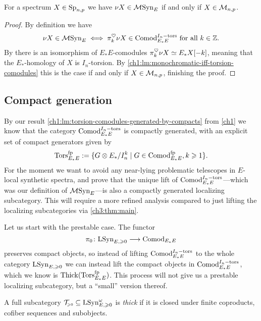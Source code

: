 \begin{lemma}
    \label{ch3:add:lm:mono-iff-syn-mono}
    For a spectrum $X\in \mathrm{Sp}_{n,p}$ we have $\nu X \in \mathcal{M}\mathrm{Syn}_{E}$ if and only if $X\in \mathcal{M}_{n,p}$. 
\end{lemma}
\begin{proof}
    By definition we have 
    \[\nu X \in \mathcal{M}\mathrm{Syn}_{E} \iff \pi_k^\heartsuit \nu X \in \mathrm{Comod}_{E_*E}^{I_n-\mathrm{tors}} \text{ for all } k\in \mathbb{Z}.\]
    By \cite[4.21, 4.22]{pstragowski_2022} there is an isomorphism of $E_*E$-comodules $\pi_k^\heartsuit \nu X \simeq E_{*} X[-k]$, meaning that the $E_{*}$-homology of $X$ is $I_n$-torsion. By \cref{ch1:lm:monochromatic-iff-torsion-comodules} this is the case if and only if $X\in \mathcal{M}_{n,p}$, finishing the proof. 
\end{proof}










\subsection{Compact generation}

By our result \cref{ch1:lm:torsion-comodules-generated-by-compacts} from \cref{ch1} we know that the category $\mathrm{Comod}_{E_*E}^{I_n-\mathrm{tors}}$ is compactly generated, with an explicit set of compact generators given by 
\[\mathrm{Tors}_{E_*E}^{\mathrm{fp}} := \{G\otimes E_*/I_n^k \mid G\in \mathrm{Comod}_{E_*E}^{\mathrm{fp}}, k\geqslant 1\}.\]
For the moment we want to avoid any near-lying problematic telescopes in $E$-local synthetic spectra, and prove that the unique lift of $\mathrm{Comod}_{E_*E}^{I_n-\mathrm{tors}}$---which was our definition of $\mathcal{M}\mathrm{Syn}_{E}$---is also a compactly generated localizing subcategory. This will require a more refined analysis compared to just lifting the localizing subcategories via \cref{ch3:thm:main}. 

Let us start with the prestable case. The functor 
\[\pi_0 \colon \mathrm{LSyn}_{E, \geqslant 0} \longrightarrow \mathrm{Comod}_{E_*E}\]
preserves compact objects, so instead of lifting $\mathrm{Comod}_{E_*E}^{I_n-\mathrm{tors}}$ to the whole category $\mathrm{LSyn}_{E, \geqslant 0}$ we can instead lift the compact objects in $\mathrm{Comod}_{E_*E}^{I_n-\mathrm{tors}}$, which we know is $\operatorname{Thick}(\mathrm{Tors}_{E_*E}^{\mathrm{fp}})$. This process will not give us a prestable localizing subcategory, but a ``small'' version thereof. 

\begin{definition}
    A full subcategory $\mathcal{T}_{\hspace{-1pt}\scriptscriptstyle\geqslant 0} \subseteq \mathrm{LSyn}_{E, \geqslant 0}^\omega$ is \emph{thick} if it is closed under finite coproducts, cofiber sequences and subobjects. 
\end{definition}

